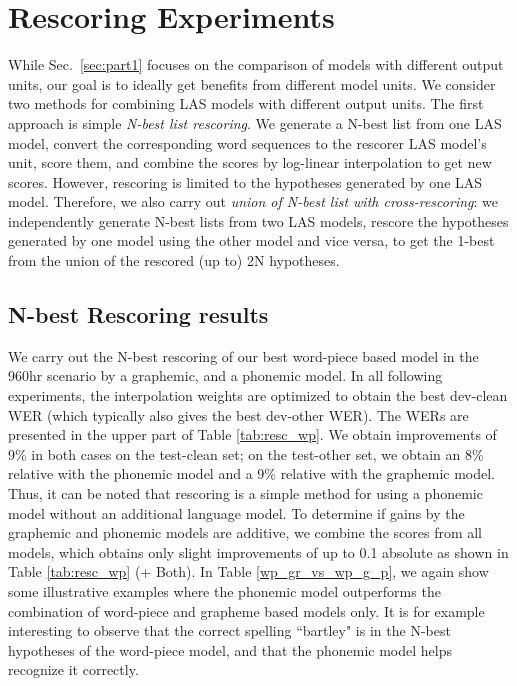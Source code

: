 \documentclass[a4paper]{article}
\begin{document}
\section{Rescoring Experiments}
\label{sec:part2}
\vspace{-2mm}
While Sec.~\ref{sec:part1} focuses on the comparison of models with different output
units, our goal is to ideally get benefits from different model units.
We consider two methods for combining LAS models with different output units.
The first approach is simple \textit{N-best list rescoring}.
We generate a N-best list from one LAS model, convert the corresponding word
sequences to the rescorer LAS model's unit, score them, and combine the scores
by log-linear interpolation to get new scores.
However, rescoring is limited to the hypotheses generated by one LAS model.
Therefore, we also carry out \textit{union of N-best list with cross-rescoring}:
we independently generate N-best lists from two LAS models, rescore the
hypotheses generated by one model using the other model and vice versa, to get the
1-best from the union of the rescored (up to) 2N hypotheses.
\vspace{-3mm}
\subsection{N-best Rescoring results}
\vspace{-2mm}
We carry out the N-best rescoring of our best word-piece based model in the 960hr scenario by a graphemic, and
a phonemic model. In all following experiments, the interpolation weights are optimized to obtain the best
dev-clean WER (which typically also gives the best dev-other WER).
The WERs are presented in the upper part of Table \ref{tab:resc_wp}.
We obtain improvements of 9\% in both cases on the test-clean set;
on the test-other set, we obtain an 8\% relative with the phonemic model and a 9\% relative with the graphemic model.
Thus, it can be noted that rescoring is a simple method for using
a phonemic model without an additional language model.
To determine if gains by the graphemic and phonemic models are additive, we
combine the scores from all models, which obtains only slight improvements of up
to 0.1 absolute as shown in Table \ref{tab:resc_wp} (+ Both).
In Table \ref{wp_gr_vs_wp_g_p}, we again show some illustrative examples
where the phonemic model outperforms the combination
of word-piece and grapheme based models only.
It is for example interesting to observe that the correct spelling ``bartley" is in the N-best hypotheses
of the word-piece model, and that the phonemic model helps recognize it correctly.
\end{document}
